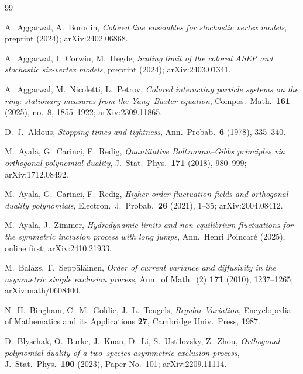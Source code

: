 \begin{thebibliography}{99}

 A.~Aggarwal, A.~Borodin, \emph{Colored line ensembles for
stochastic vertex models}, preprint (2024); arXiv:2402.06868.

 A.~Aggarwal, I.~Corwin, M.~Hegde, \emph{Scaling limit of the colored
ASEP and stochastic six-vertex models}, preprint (2024); arXiv:2403.01341.

 A.~Aggarwal, M.~Nicoletti, L.~Petrov, \emph{Colored interacting
particle systems on the ring: stationary measures from the Yang--Baxter equation},
Compos.~Math.~\textbf{161} (2025), no.~8, 1855--1922; arXiv:2309.11865.

 D.~J.~Aldous, \emph{Stopping times and tightness},
Ann.~Probab.~\textbf{6} (1978), 335--340.

 M.~Ayala, G.~Carinci, F.~Redig, \emph{Quantitative Boltzmann--Gibbs
principles via orthogonal polynomial duality}, J.~Stat.~Phys.~\textbf{171} (2018),
980--999; arXiv:1712.08492.

 M.~Ayala, G.~Carinci, F.~Redig, \emph{Higher order fluctuation fields and
orthogonal duality polynomials}, Electron.~J.~Probab.~\textbf{26} (2021), 1--35;
arXiv:2004.08412.

 M.~Ayala, J.~Zimmer, \emph{Hydrodynamic limits and
non-equilibrium fluctuations for the symmetric inclusion process with long jumps},
Ann.~Henri Poincar\'e (2025), online first; arXiv:2410.21933.

 M.~Bal\'azs, T.~Sepp\"al\"ainen, \emph{Order of current
variance and diffusivity in the asymmetric simple exclusion process}, Ann.~of
Math.~(2) \textbf{171} (2010), 1237--1265; arXiv:math/0608400.

 N.~H.~Bingham, C.~M.~Goldie, J.~L.~Teugels, \emph{Regular Variation},
Encyclopedia of Mathematics and its Applications \textbf{27}, Cambridge Univ.\ Press,
1987.

 D.~Blyschak, O.~Burke, J.~Kuan, D.~Li, S.~Ustilovsky, Z.~Zhou,
\emph{Orthogonal polynomial duality of a two--species asymmetric exclusion process},
J.~Stat.~Phys.~\textbf{190} (2023), Paper No.~101; arXiv:2209.11114.


\end{thebibliography}
